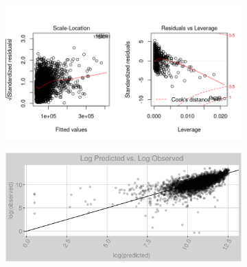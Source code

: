 \begin{figure}[h]
\centering
\begin{subfigure}{1\textwidth}
\centering
\includegraphics[width=.99\textwidth, height=0.425\textheight]{Images/electricity_psf_nn_res_2.png}
\end{subfigure}
\begin{subfigure}{1\textwidth}
\centering
\includegraphics[width=.99\textwidth, height=0.475\textheight]{Images/electricity_psf_nn_pvo.png}
\end{subfigure}
\end{figure}
\FloatBarrier
\newpage
